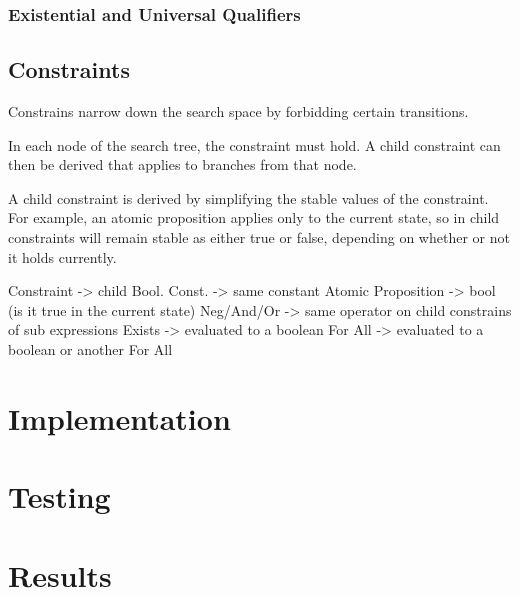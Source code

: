 \documentclass[a4paper,11pt]{article}
\begin{document}
	\subsubsection{Existential and Universal Qualifiers}
	
	
	\subsection{Constraints}
	Constrains narrow down the search space by forbidding certain transitions.
	
	In each node of the search tree, the constraint must hold. A child constraint can then be derived that applies to branches from that node. 
	
	A child constraint is derived by simplifying the stable values of the constraint. For example, an atomic proposition applies only to the current state, so in child constraints will remain stable as either true or false, depending on whether or not it holds currently.
	
	Constraint -> child 
	Bool. Const. -> same constant
	Atomic Proposition -> bool (is it true in the current state)
	Neg/And/Or -> same operator on child constrains of sub expressions
	Exists -> evaluated to a boolean
	For All -> evaluated to a boolean or another For All
	
	\section{Implementation}
	
	\section{Testing}
	
	\section{Results}
	
	\pagebreak
	\begin{thebibliography}{9}
		
		
		
		
		
	\end{thebibliography}
\end{document}
